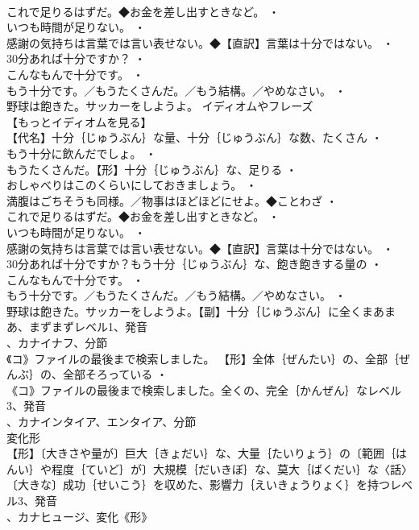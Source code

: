 \documentclass[8pt]{extreport}
\begin{document}
\begin{CJK}{UTF8}{min}
\\	これで足りるはずだ。◆お金を差し出すときなど。 ・
\\	いつも時間が足りない。 ・
\\	感謝の気持ちは言葉では言い表せない。◆【直訳】言葉は十分ではない。 ・
\\	30分あれば十分ですか？ ・
\\	こんなもんで十分です。 ・
\\	もう十分です。／もうたくさんだ。／もう結構。／やめなさい。 ・
\\	野球は飽きた。サッカーをしようよ。	イディオムやフレーズ 
\\	【もっとイディオムを見る】
\\	【代名】十分｛じゅうぶん｝な量、十分｛じゅうぶん｝な数、たくさん ・
\\	もう十分に飲んだでしょ。 ・
\\	もうたくさんだ。【形】十分｛じゅうぶん｝な、足りる ・
\\	おしゃべりはこのくらいにしておきましょう。 ・
\\	満腹はごちそうも同様。／物事はほどほどにせよ。◆ことわざ ・
\\	これで足りるはずだ。◆お金を差し出すときなど。 ・
\\	いつも時間が足りない。 ・
\\	感謝の気持ちは言葉では言い表せない。◆【直訳】言葉は十分ではない。 ・
\\	30分あれば十分ですか？もう十分｛じゅうぶん｝な、飽き飽きする量の ・
\\	こんなもんで十分です。 ・
\\	もう十分です。／もうたくさんだ。／もう結構。／やめなさい。 ・
\\	野球は飽きた。サッカーをしようよ。【副】十分｛じゅうぶん｝に全くまあまあ、まずまずレベル1、発音
\\	、カナイナフ、分節
\\	《コ》ファイルの最後まで検索しました。		【形】全体｛ぜんたい｝の、全部｛ぜんぶ｝の、全部そろっている ・
\\	《コ》ファイルの最後まで検索しました。全くの、完全｛かんぜん｝なレベル3、発音
\\	、カナインタイア、エンタイア、分節
\\	変化形 
\\	【形】〔大きさや量が〕巨大｛きょだい｝な、大量｛たいりょう｝の〔範囲｛はんい｝や程度｛ていど｝が〕大規模｛だいきぼ｝な、莫大｛ばくだい｝な〈話〉〔大きな〕成功｛せいこう｝を収めた、影響力｛えいきょうりょく｝を持つレベル3、発音
\\	、カナヒュージ、変化《形》

\end{CJK}
\end{document}
